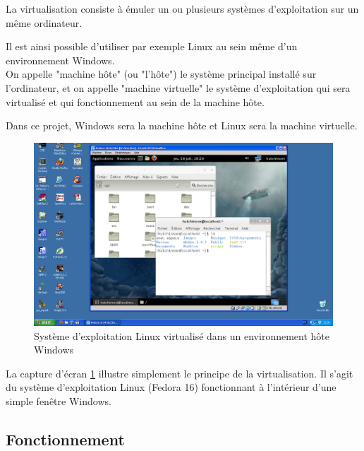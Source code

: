 La virtualisation consiste à émuler un ou plusieurs systèmes d'exploitation sur un même ordinateur.

Il est ainsi possible d'utiliser par exemple Linux au sein même d'un environnement Windows.
\\


On appelle "machine hôte" (ou "l'hôte") le système principal installé sur l'ordinateur, et on appelle "machine virtuelle" le système d'exploitation qui sera virtualisé et qui fonctionnement au sein de la machine hôte.

Dans ce projet, Windows sera la machine hôte et Linux sera la machine virtuelle.
\\


\begin{figure}[!h]
	\center
	\includegraphics[scale=0.35]{img/Virtualisation.png}
	\caption{Système d'exploitation Linux virtualisé dans un environnement hôte Windows}
	\label{Screenshot Virtualisation}
\end{figure}

La capture d'écran \ref{Screenshot Virtualisation} illustre simplement le principe de la virtualisation.
Il s'agit du système d'exploitation Linux (Fedora 16) fonctionnant à l'intérieur d'une simple fenêtre Windows.
\\





\subsection{Fonctionnement}

